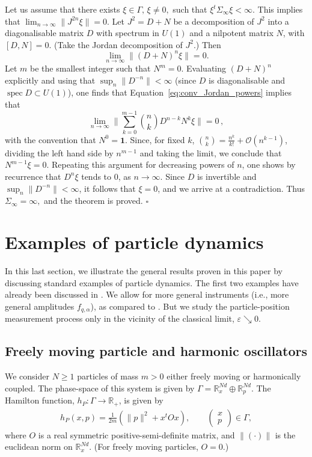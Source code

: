 \documentclass[12pt]{article}
\newcommand{\id}{\mathbf{1}}
\begin{document}
Let us assume that there exists $\xi\in \Gamma,\, \xi \neq0,$ such that $\xi^t\Sigma_\infty\xi<\infty$. 
This implies that $\lim_{n\to\infty} \|J^{2n}\xi\|=0$. Let $J^2=D+N$ be a decomposition of $J^2$ into a 
diagonalisable matrix $D$ with spectrum in $U(1)$ and a nilpotent matrix $N$, with $[D,N]=0$. (Take 
the Jordan decomposition of $J^2$.) Then
	\begin{equation}\label{eq:conv_Jordan_powers}
		\lim_{n\to \infty}\|(D+N)^n\xi\|=0.
	\end{equation}
	Let $m$ be the smallest integer such that $N^m=0$. Evaluating 
	$(D+N)^n$ explicitly and using that $\sup_n\|D^{-n}\|<\infty$ (since $D$ is diagonalisable and 
	$\operatorname{spec}D\subset U(1)$), one finds that
	Equation~\eqref{eq:conv_Jordan_powers} implies that
	\begin{equation}\label{eq:conv_Jordan_powers_developped}
		\lim_{n\to \infty}\|\sum_{k=0}^{m-1}\binom{n}{k}D^{n-k} N^k\xi\|=0\,,
	\end{equation}
	with the convention that $N^0=\id$. Since, for fixed $k$, $\binom{n}{k}=\frac{n^k}{k!}+\mathcal O(n^{k-1})$, dividing the left hand side by $n^{m-1}$ and taking the limit, we conclude that $N^{m-1}\xi=0$. Repeating this argument for decreasing powers of $n$, one shows by recurrence that $D^n \xi$ tends to 0, as $n\rightarrow \infty$. Since $D$ is invertible and 
	$\sup_n\|D^{-n}\|<\infty$, it follows that $\xi=0$, and we arrive at a contradiction. Thus
	$\Sigma_\infty=\infty,$
	and the theorem is proved.  \hfill{$\square$}

\section{Examples of particle dynamics}
In this last section, we illustrate the general results proven in this paper by discussing standard 
examples of particle dynamics. 
The first two examples have already been discussed in \cite{BBFF}. We allow for 
more general instruments (i.e., more general amplitudes $f_{q, \alpha}$), as compared to \cite{BBFF}. But we study the particle-position measurement process 
only in the vicinity of the classical limit, $\varepsilon \searrow 0$. 
\subsection{Freely moving particle and harmonic oscillators}
We consider $N\geq 1$ particles of mass $m>0$ either freely moving or harmonically coupled. 
The phase-space of this system is given by $\Gamma=\mathbb R_x^{Nd}\oplus \mathbb R_p^{Nd}$. The Hamilton function,
$h_P: \Gamma \to\mathbb R_+$, is given by
\begin{align*}
h_P(x,p) = \frac{1}{2m} (\|p\|^2+x^tOx), \qquad \begin{pmatrix} x\\ p \end{pmatrix}\in \Gamma,
\end{align*}
where $O$ is a real symmetric positive-semi-definite matrix, and $\|(\cdot)\|$ is the euclidean norm on
$\mathbb{R}_{x}^{Nd}$. (For freely moving particles, $O=0$.)
\end{document}
